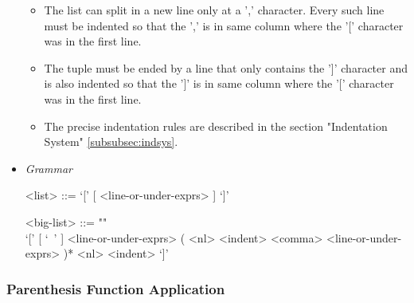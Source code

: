 \documentclass{article}
\begin{document}
\begin{itemize}
\begin{itemize}
  \item
  The list can split in a new line only at a ',' character. Every such line must
  be indented so that the ',' is in same column where the '[' character was in
  the first line.

  \item
  The tuple must be ended by a line that only contains the ']' character and is 
  also indented so that the ']' is in same column where the '[' character was in
  the first line.

  \item
  The precise indentation rules are described in the section
  "Indentation System" \ref{subsubsec:indsys}.
  \end{itemize}

\item \textit{Grammar}
\begin{grammar}
<list> ::= `[' [ <line-or-under-exprs> ] `]'

<big-list> ::= ""\\
`[' [ `\ ' ] <line-or-under-exprs>
( <nl> <indent> <comma> <line-or-under-exprs> )* <nl> <indent> `]'
\end{grammar}

\end{itemize}

\subsubsection{Parenthesis Function Application}
\label{subsec:parenfuncapp}
\end{document}
